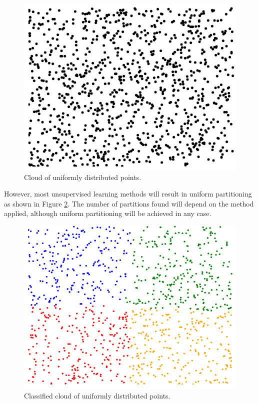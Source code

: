 \begin{figure}[!h]
	\centering
	\includegraphics[scale=0.2]{gfx/Clustering/rand.png} 
	\caption{Cloud of uniformly distributed points.}\label{fig:uniform_cloud}
\end{figure}

However, most unsupervised learning methods will result in uniform partitioning as shown in Figure \ref{fig:uniform_partition}. The number of partitions found will depend on the method applied, although uniform partitioning will be achieved in any case.

\begin{figure}[!h]
	\centering
	\includegraphics[scale=0.2]{gfx/Clustering/randClasif.png} 
	\caption{Classified cloud of uniformly distributed points.}\label{fig:uniform_partition}
\end{figure}

